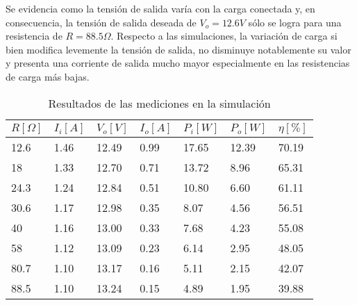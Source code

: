Se evidencia como la tensión de salida varía con la carga conectada y, en consecuencia, la tensión de salida deseada de $V_{o}=12.6V$ sólo se logra para una resistencia de $R=88.5\Omega$.
Respecto a las simulaciones, la variación de carga si bien modifica levemente la tensión de salida, no disminuye notablemente su valor y presenta una corriente de salida mucho mayor especialmente en las resistencias de carga más bajas.

\begin{table}[H]
    \centering
    \begin{tabular}{lllllll}
    \hline
    $R[\Omega]$ & $I_i[A]$ & $V_o[V]$ & $I_o[A]$ & \multicolumn{1}{c}{$P_i[W]$} & \multicolumn{1}{c}{$P_o[W]$} & \multicolumn{1}{c}{$\eta[\%]$} \\ \hline
    12.6        & 1.46     & 12.49    & 0.99     & 17.65                        & 12.39                        & 70.19                          \\
    18          & 1.33     & 12.70    & 0.71     & 13.72                        & 8.96                         & 65.31                          \\
    24.3        & 1.24     & 12.84    & 0.51     & 10.80                        & 6.60                         & 61.11                          \\
    30.6        & 1.17     & 12.98    & 0.35     & 8.07                         & 4.56                         & 56.51                          \\
    40          & 1.16     & 13.00    & 0.33     & 7.68                         & 4.23                         & 55.08                          \\
    58          & 1.12     & 13.09    & 0.23     & 6.14                         & 2.95                         & 48.05                          \\
    80.7        & 1.10     & 13.17    & 0.16     & 5.11                         & 2.15                         & 42.07                          \\
    88.5        & 1.10     & 13.24    & 0.15     & 4.89                         & 1.95                         & 39.88                          \\ \hline
    \end{tabular}
    \caption{Resultados de las mediciones en la simulación}
    \label{tab:mediciones_sim}
\end{table}